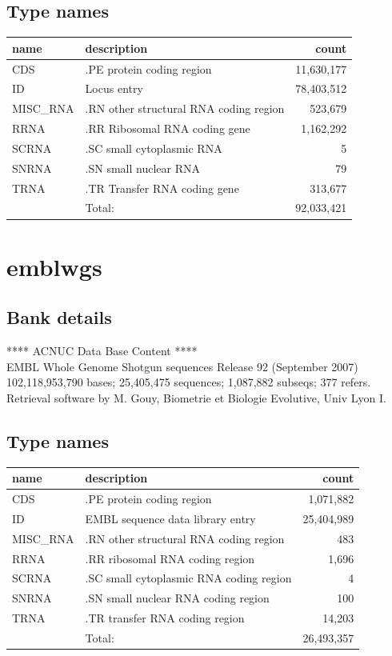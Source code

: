 \documentclass{article}
\begin{document}
\begin{Schunk}
\subsection{Type names}
\noindent\begin{tabular}{llr}
\hline \hline
name & description & count \\
\hline
CDS  &  .PE protein coding region  &  11,630,177 \\
ID  &  Locus entry  &  78,403,512 \\
MISC\_RNA  &  .RN other structural RNA coding region  &  523,679 \\
RRNA  &  .RR Ribosomal RNA coding gene  &  1,162,292 \\
SCRNA  &  .SC small cytoplasmic RNA  &  5 \\
SNRNA  &  .SN small nuclear RNA  &  79 \\
TRNA  &  .TR Transfer RNA coding gene  &  313,677 \\
\hline
 & Total: & 92,033,421 \\
\hline \hline
\end{tabular}

\section{ emblwgs }
\subsection{Bank details}
             ****     ACNUC Data Base Content      ****                         \\
        EMBL Whole Genome Shotgun sequences Release 92  (September 2007)  \\
102,118,953,790 bases; 25,405,475 sequences; 1,087,882 subseqs; 377 refers.\\
Retrieval software by M. Gouy, Biometrie et Biologie Evolutive, Univ Lyon I. 

\subsection{Type names}
\noindent\begin{tabular}{llr}
\hline \hline
name & description & count \\
\hline
CDS  &  .PE protein coding region  &  1,071,882 \\
ID  &  EMBL sequence data library entry  &  25,404,989 \\
MISC\_RNA  &  .RN other structural RNA coding region  &  483 \\
RRNA  &  .RR ribosomal RNA coding region  &  1,696 \\
SCRNA  &  .SC small cytoplasmic RNA coding region  &  4 \\
SNRNA  &  .SN small nuclear RNA coding region  &  100 \\
TRNA  &  .TR transfer RNA coding region  &  14,203 \\
\hline
 & Total: & 26,493,357 \\
\hline \hline
\end{tabular}


\end{Schunk}
\end{document}
